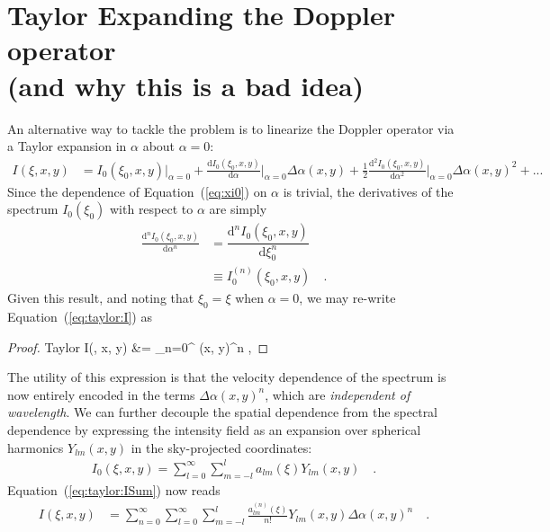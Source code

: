 \documentclass[modern]{aastex62}
\begin{document}
\appendix

\section{Taylor Expanding the Doppler operator \\ (and why this is a bad idea)}
\label{sec:taylor}
%
An alternative way to tackle the problem is to linearize the Doppler 
operator via a Taylor expansion in $\alpha$ about $\alpha=0$:
%
\begin{align}
    \label{eq:taylor:I}
    I(\xi, x, y) 
        &=
        I_0(\xi_0, x, y) \Bigg|_{\alpha=0}
        + 
        \frac{\mathrm{d}I_0(\xi_0, x, y)}{\mathrm{d}\alpha} \Bigg|_{\alpha=0} 
            \Delta\alpha(x, y)
        + 
        \frac{1}{2}\frac{\mathrm{d}^2I_0(\xi_0, x, y)}{\mathrm{d}\alpha^2} 
            \Bigg|_{\alpha=0} \Delta\alpha(x, y)^2
        +
        ... 
\end{align}
%
Since the dependence of Equation~(\ref{eq:xi0}) on $\alpha$ is trivial,
the derivatives of the spectrum $I_0(\xi_0)$ with respect to
$\alpha$ are simply
%
\begin{align}
    \frac{\mathrm{d}^nI_0(\xi_0, x, y)}{\mathrm{d}\alpha^n} &=
    \dfrac{\mathrm{d}^nI_0(\xi_0, x, y)}{\mathrm{d}\xi_0^n} \nonumber\\ &\equiv
    I_0^{(n)}(\xi_0, x, y)
    \quad.
\end{align}
%
Given this result, and noting that $\xi_0 = \xi$ when $\alpha = 0$,
we may re-write Equation~(\ref{eq:taylor:I}) as
%
\begin{proof}{Taylor}
    \label{eq:taylor:ISum}
    I(\xi, x, y) 
        &=
        \sum_{n=0}^\infty
            \Delta\alpha(x, y)^n
        \quad ,
\end{proof}
%
The utility of this expression is that the velocity dependence of the spectrum
is now entirely encoded in the terms $\Delta\alpha(x, y)^n$, which are
\emph{independent of wavelength}. We can further decouple the spatial
dependence from the spectral dependence by expressing the intensity field
as an expansion over spherical harmonics $Y_{lm}(x, y)$ in the sky-projected
coordinates:
%
\begin{align}
    I_0(\xi, x, y) = \sum_{l=0}^\infty\sum_{m=-l}^{l} a_{lm}(\xi) Y_{lm}(x, y)
    \quad .
\end{align}
%
Equation~(\ref{eq:taylor:ISum}) now reads
%
\begin{align}
    \label{eq:taylor:IYlm}
    I(\xi, x, y) 
        &=
        \sum_{n=0}^\infty
            \sum_{l=0}^\infty\sum_{m=-l}^{l}
                \frac{a_{lm}^{(n)}(\xi)}{n!}
                Y_{lm}(x, y)\Delta\alpha(x, y)^n
            \quad .
\end{align}
\end{document}

